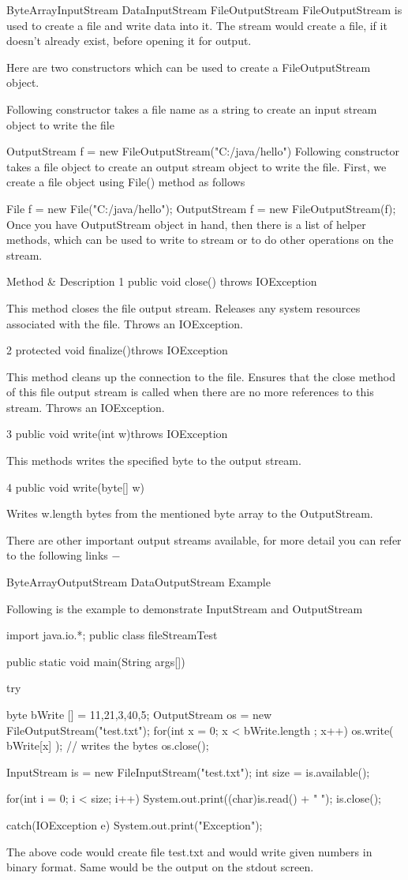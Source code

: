 ByteArrayInputStream
DataInputStream
FileOutputStream
FileOutputStream is used to create a file and write data into it. The stream would create a file, if it doesn't already exist, before opening it for output.

Here are two constructors which can be used to create a FileOutputStream object.

Following constructor takes a file name as a string to create an input stream object to write the file

OutputStream f = new FileOutputStream("C:/java/hello")
Following constructor takes a file object to create an output stream object to write the file. First, we create a file object using File() method as follows

File f = new File("C:/java/hello");
OutputStream f = new FileOutputStream(f);
Once you have OutputStream object in hand, then there is a list of helper methods, which can be used to write to stream or to do other operations on the stream.

 	Method & Description
1
public void close() throws IOException{}

This method closes the file output stream. Releases any system resources associated with the file. Throws an IOException.

2
protected void finalize()throws IOException {}

This method cleans up the connection to the file. Ensures that the close method of this file output stream is called when there are no more references to this stream. Throws an IOException.

3
 public void write(int w)throws IOException{}

This methods writes the specified byte to the output stream.

4
 public void write(byte[] w)

Writes w.length bytes from the mentioned byte array to the OutputStream.

There are other important output streams available, for more detail you can refer to the following links −

ByteArrayOutputStream
DataOutputStream
Example

Following is the example to demonstrate InputStream and OutputStream

import java.io.*;
public class fileStreamTest {

   public static void main(String args[]) {

      try {
         byte bWrite [] = {11,21,3,40,5};
         OutputStream os = new FileOutputStream("test.txt");
         for(int x = 0; x < bWrite.length ; x++) {
            os.write( bWrite[x] );   // writes the bytes
         }
         os.close();

         InputStream is = new FileInputStream("test.txt");
         int size = is.available();

         for(int i = 0; i < size; i++) {
            System.out.print((char)is.read() + "  ");
         }
         is.close();
      }catch(IOException e) {
         System.out.print("Exception");
      }
   }
}
The above code would create file test.txt and would write given numbers in binary format. Same would be the output on the stdout screen.

